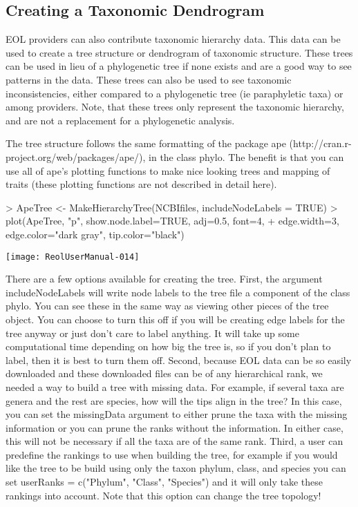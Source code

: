 \documentclass[12pt]{article}
\begin{document}
\subsection{Creating a Taxonomic Dendrogram}
EOL providers can also contribute taxonomic hierarchy data. This data can be used to create a tree structure or dendrogram of taxonomic structure. These trees can be used in lieu of a phylogenetic tree if none exists and are a good way to see patterns in the data. These trees can also be used to see taxonomic inconsistencies, either compared to a phylogenetic tree (ie paraphyletic taxa) or among providers. Note, that these trees only represent the taxonomic hierarchy, and are not a replacement for a phylogenetic analysis. 

The tree structure follows the same formatting of the package ape (http://cran.r-project.org/web/packages/ape/), in the class phylo. The benefit is that you can use all of ape's plotting functions to make nice looking trees and mapping of traits (these plotting functions are not described in detail here). 

\begin {center}
\begin{Schunk}
\begin{Sinput}
> ApeTree <- MakeHierarchyTree(NCBIfiles, includeNodeLabels = TRUE)
> plot(ApeTree, "p", show.node.label=TRUE, adj=0.5, font=4, 
+ 	edge.width=3, edge.color="dark gray", tip.color="black")
\end{Sinput}
\end{Schunk}
\texttt{[image: ReolUserManual-014]}
\end{center}

There are a few options available for creating the tree.  First, the argument includeNodeLabels will write node labels to the tree file a component of the class phylo.  You can see these in the same way as viewing other pieces of the tree object.  You can choose to turn this off if you will be creating edge labels for the tree anyway or just don't care to label anything.  It will take up some computational time depending on how big the tree is, so if you don't plan to label, then it is best to turn them off.  Second, because EOL data can be so easily downloaded and these downloaded files can be of any hierarchical rank, we needed a way to build a tree with missing data.  For example, if several taxa are genera and the rest are species, how will the tips align in the tree?  In this case, you can set the missingData argument to either prune the taxa with the missing information or you can prune the ranks without the information.  In either case, this will not be necessary if all the taxa are of the same rank.  Third, a user can predefine the rankings to use when building the tree, for example if you would like the tree to be build using only the taxon phylum, class, and species you can set userRanks = c("Phylum", "Class", "Species") and it will only take these rankings into account.  Note that this option can change the tree topology!  
\end{document}
